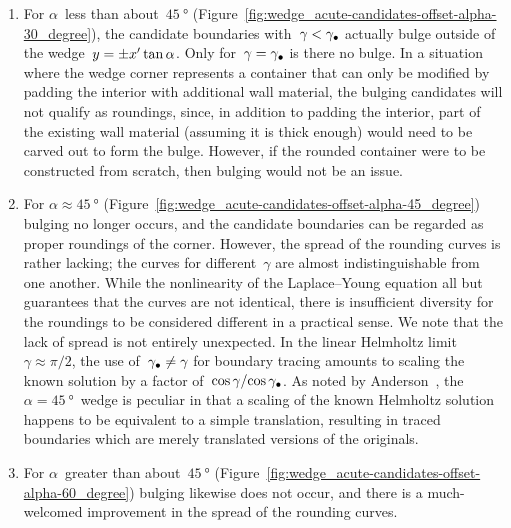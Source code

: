 \begin{enumerate}
  \item
    For $\alpha$~less than about~$\SI{45}{\degree}$
    (Figure~\ref{fig:wedge_acute-candidates-offset-alpha-30_degree}),
    the candidate boundaries with~$\gamma < \gamma_\bullet$
    actually bulge outside of the wedge~$y = \pm x' \tan\alpha$.
    Only for~$\gamma = \gamma_\bullet$ is there no bulge.
    In a situation where the wedge corner represents a container
    that can only be modified by padding the interior
    with additional wall material,
    the bulging candidates will not qualify as roundings,
    since, in addition to padding the interior,
    part of the existing wall material
    (assuming it is thick enough)
    would need to be carved out to form the bulge.
    However, if the rounded container were to be constructed from scratch,
    then bulging would not be an issue.
  \item
    For $\alpha \approx \SI{45}{\degree}$
    (Figure~\ref{fig:wedge_acute-candidates-offset-alpha-45_degree})
    bulging no longer occurs,
    and the candidate boundaries can be regarded
    as proper roundings of the corner.
    However, the spread of the rounding curves is rather lacking;
    the curves for different~$\gamma$ are almost indistinguishable
    from one another.
    While the nonlinearity of the Laplace--Young equation all but guarantees
    that the curves are not identical,
    there is insufficient diversity
    for the roundings to be considered different in a practical sense.
    We note that the lack of spread is not entirely unexpected.
    In the linear Helmholtz limit~$\gamma \approx \pi/2$,
    the use of~$\gamma_\bullet \ne \gamma$ for boundary tracing
    amounts to scaling the known solution
    by a factor of~$\cos\gamma / {\cos\gamma_\bullet}$.
    As noted
    by Anderson~\cite[(7.8)]{anderson-2002-thesis-boundary-tracing-pdes},
    the $\alpha = \SI{45}{\degree}$~wedge is peculiar
    in that a scaling of the known Helmholtz solution
    happens to be equivalent to a simple translation,
    resulting in traced boundaries which are merely translated versions
    of the originals.
  \item
    For $\alpha$~greater than about~$\SI{45}{\degree}$
    (Figure~\ref{fig:wedge_acute-candidates-offset-alpha-60_degree})
    bulging likewise does not occur,
    and there is a much-welcomed improvement
    in the spread of the rounding curves.
\end{enumerate}

\begin{figure}
\end{figure}

